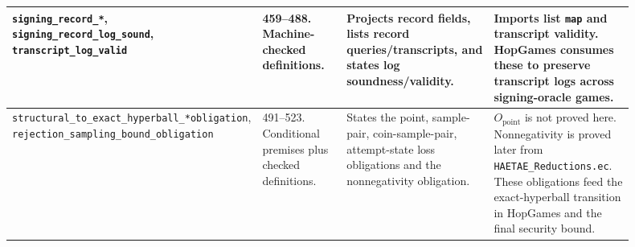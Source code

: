 \documentclass[11pt]{report}
\DeclareRobustCommand{\file}[1]{\ifmmode\text{\nolinkurl{#1}}\else\nolinkurl{#1}\fi}
\DeclareRobustCommand{\ec}[1]{\ifmmode\text{\nolinkurl{#1}}\else\nolinkurl{#1}\fi}
\theoremstyle{definition}
\theoremstyle{plain}
\begin{document}
{\begin{longtable}{p{0.24\linewidth}p{0.15\linewidth}p{0.27\linewidth}p{0.24\linewidth}}
\midrule
\ec{signing\_record\_*},
\ec{signing\_record\_log\_sound},
\ec{transcript\_log\_valid} &
459--488. Machine-checked definitions. &
Projects record fields, lists record queries/transcripts, and states log
soundness/validity. &
Imports list \ec{map} and transcript validity.  HopGames consumes these to
preserve transcript logs across signing-oracle games. \\
\midrule
\ec{structural\_to\_exact\_hyperball\_*obligation},
\ec{rejection\_sampling\_bound\_obligation} &
491--523. Conditional premises plus checked definitions. &
States the point, sample-pair, coin-sample-pair, attempt-state loss
obligations and the nonnegativity obligation. &
\(O_{\mathrm{point}}\) is not proved here.  Nonnegativity is proved later from
\file{HAETAE\_Reductions.ec}.  These obligations feed the exact-hyperball
transition in HopGames and the final security bound. \\
\bottomrule
\end{longtable}
}
\end{document}
